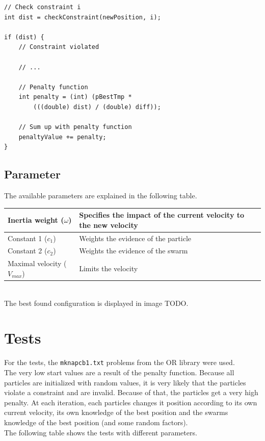 \documentclass{article}
\begin{document}
\begin{lstlisting}[caption="Solver.cpp"]
// Check constraint i
int dist = checkConstraint(newPosition, i);

if (dist) {
	// Constraint violated
	
	// ...
	
	// Penalty function
	int penalty = (int) (pBestTmp *
		(((double) dist) / (double) diff));
		
	// Sum up with penalty function
	penaltyValue += penalty;
}
\end{lstlisting}

\subsection{Parameter}
The available parameters are explained in the following table.\\

\begin{tabular}{|l|l|}
	\hline
	Inertia weight ($\omega$) & Specifies the impact of the current velocity to the new velocity \\ \hline
	Constant 1 ($c_1$) & Weights the evidence of the particle \\ \hline
	Constant 2 ($c_2$) & Weights the evidence of the swarm \\ \hline
	Maximal velocity ($V_{max}$) & Limits the velocity \\ \hline
\end{tabular}\\

The best found configuration is displayed in image TODO.

\section{Tests}
\label{lbl-tests}
For the tests, the \lstinline$mknapcb1.txt$ problems from the OR library were used. \\
The very low start values are a result of the penalty function. Because all particles are initialized with random values, it is very likely that the particles violate a constraint and are invalid. Because of that, the particles get a very high penalty. At each iteration, each particles changes it position according to its own current velocity, its own knowledge of the best position and the swarms knowledge of the best position (and some random factors).\\

The following table shows the tests with different parameters.
\end{document}
